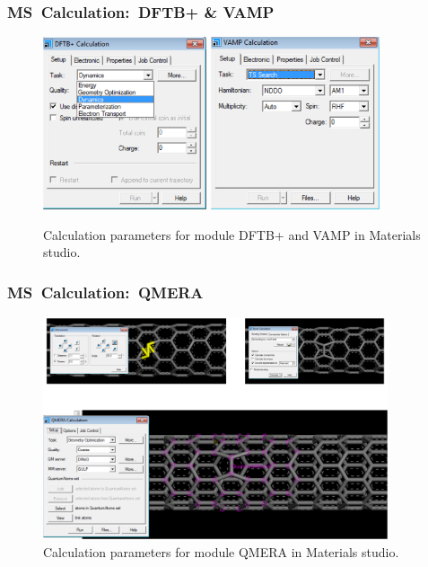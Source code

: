 \frame
{
	\frametitle{\textrm{MS~Calculation:~DFTB+ \& VAMP}}
\begin{figure}[h!]
\centering
\vspace*{-0.15in}
\includegraphics[height=2.00in,width=1.90in,viewport=0 0 635 671,clip]{Figures/MS-Caluculator_DFTB-parameter.png}
\includegraphics[height=2.00in,width=1.96in,viewport=0 0 723 739,clip]{Figures/MS-Caluculator_VAMP-parameter.png}
\caption{\tiny \textrm{Calculation parameters for module DFTB+ and VAMP in Materials studio.}}%
\label{MS-Calculation_DFTB-VAMP}
\end{figure}
}

\frame
{
	\frametitle{\textrm{MS~Calculation:~QMERA}}
\begin{figure}[h!]
\centering
\vspace*{-0.18in}
\includegraphics[height=2.58in,width=4.00in,viewport=0 0 1161 746,clip]{Figures/MS-Caluculator_QMERA-parameter.png}
\caption{\tiny \textrm{Calculation parameters for module QMERA in Materials studio.}}%
\label{MS-QMERA}
\end{figure}
}


